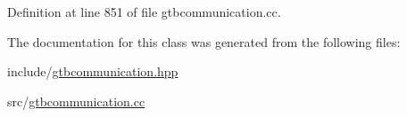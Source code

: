Definition at line 851 of file gtbcommunication.\-cc.



The documentation for this class was generated from the following files\-:\begin{DoxyCompactItemize}
\item 
include/\hyperlink{gtbcommunication_8hpp}{gtbcommunication.\-hpp}\item 
src/\hyperlink{gtbcommunication_8cc}{gtbcommunication.\-cc}\end{DoxyCompactItemize}
